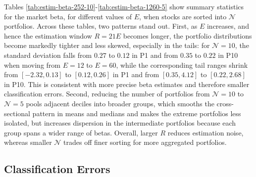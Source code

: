 Tables \ref{tab:estim-beta-252-10}-\ref{tab:estim-beta-1260-5} show summary statistics for the market beta, for different values of $E$, when stocks are sorted into $\mathcal{N}$ portfolios. Across these tables, two patterns stand out. First, as $E$ increases, and hence the estimation window $R=21E$ becomes longer, the portfolio distributions become markedly tighter and less skewed, especially in the tails: for $\mathcal{N}=10$, the standard deviation falls from $0.27$ to $0.12$ in P1 and from $0.35$ to $0.22$ in P10 when moving from $E=12$ to $E=60$, while the corresponding tail ranges shrink from $[-2.32,0.13]$ to $[0.12,0.26]$ in P1 and from $[0.35,4.12]$ to $[0.22,2.68]$ in P10. This is consistent with more precise beta estimates and therefore smaller classification errors. Second, reducing the number of portfolios from $\mathcal{N}=10$ to $\mathcal{N}=5$ pools adjacent deciles into broader groups, which smooths the cross-sectional pattern in means and medians and makes the extreme portfolios less isolated, but increases dispersion in the intermediate portfolios because each group spans a wider range of betas. Overall, larger $R$ reduces estimation noise, whereas smaller $\mathcal{N}$ trades off finer sorting for more aggregated portfolios.

 

 

 

 

 

 

\subsection{Classification Errors}
\label{app:Classification Errors}

